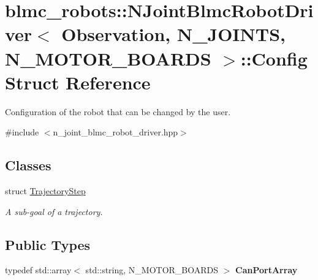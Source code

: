 \hypertarget{structblmc__robots_1_1NJointBlmcRobotDriver_1_1Config}{}\section{blmc\+\_\+robots\+:\+:N\+Joint\+Blmc\+Robot\+Driver$<$ Observation, N\+\_\+\+J\+O\+I\+N\+TS, N\+\_\+\+M\+O\+T\+O\+R\+\_\+\+B\+O\+A\+R\+DS $>$\+:\+:Config Struct Reference}
\label{structblmc__robots_1_1NJointBlmcRobotDriver_1_1Config}


Configuration of the robot that can be changed by the user.  




{\ttfamily \#include $<$n\+\_\+joint\+\_\+blmc\+\_\+robot\+\_\+driver.\+hpp$>$}

\subsection*{Classes}
\begin{DoxyCompactItemize}
\item 
struct \hyperlink{structblmc__robots_1_1NJointBlmcRobotDriver_1_1Config_1_1TrajectoryStep}{Trajectory\+Step}
\begin{DoxyCompactList}\small\item\em A sub-\/goal of a trajectory. \end{DoxyCompactList}\end{DoxyCompactItemize}
\subsection*{Public Types}
\begin{DoxyCompactItemize}
\item 
\mbox{\label{structblmc__robots_1_1NJointBlmcRobotDriver_1_1Config_a6e8a4bd6eb3d85137d3c55ef928d5a89}} 
typedef std\+::array$<$ std\+::string, N\+\_\+\+M\+O\+T\+O\+R\+\_\+\+B\+O\+A\+R\+DS $>$ {\bfseries Can\+Port\+Array}
\end{DoxyCompactItemize}
